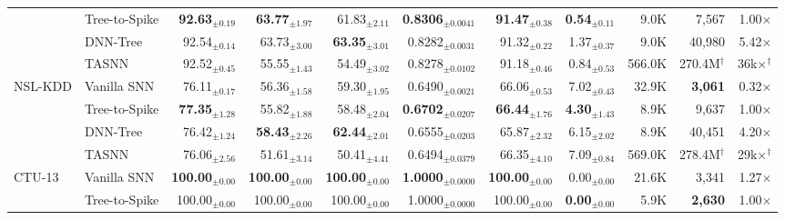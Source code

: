 \begin{table}[!ht]
{\begin{tabular}{l l r r r r r r r r r}
& Tree-to-Spike & \cellcolor{bestcell}\textbf{92.63$_{\pm0.19}$} & \cellcolor{bestcell}\textbf{63.77$_{\pm1.97}$} & 61.83$_{\pm2.11}$ & \cellcolor{bestcell}\textbf{0.8306$_{\pm0.0041}$} & \cellcolor{bestcell}\textbf{91.47$_{\pm0.38}$} & \cellcolor{bestcell}\textbf{0.54$_{\pm0.11}$} & 9.0K & 7,567 & 1.00$\times$ \\
& DNN-Tree      & 92.54$_{\pm0.14}$ & 63.73$_{\pm3.00}$ & \cellcolor{bestcell}\textbf{63.35$_{\pm3.01}$} & 0.8282$_{\pm0.0031}$ & 91.32$_{\pm0.22}$ & 1.37$_{\pm0.37}$ & 9.0K & 40,980 & 5.42$\times$ \\
& TASNN         & 92.52$_{\pm0.45}$ & 55.55$_{\pm1.43}$ & 54.49$_{\pm3.02}$ & 0.8278$_{\pm0.0102}$ & 91.18$_{\pm0.46}$ & 0.84$_{\pm0.53}$ & 566.0K & 270.4M$^\dagger$ & 36k$\times$$^\dagger$ \\
\midrule
\multirow{4}{*}{NSL-KDD}
& Vanilla SNN   & 76.11$_{\pm0.17}$ & 56.36$_{\pm1.58}$ & 59.30$_{\pm1.95}$ & 0.6490$_{\pm0.0021}$ & 66.06$_{\pm0.53}$ & 7.02$_{\pm0.43}$ & 32.9K & \cellcolor{bestcell}\textbf{3,061} & 0.32$\times$ \\
& Tree-to-Spike & \cellcolor{bestcell}\textbf{77.35$_{\pm1.28}$} & 55.82$_{\pm1.88}$ & 58.48$_{\pm2.04}$ & \cellcolor{bestcell}\textbf{0.6702$_{\pm0.0207}$} & \cellcolor{bestcell}\textbf{66.44$_{\pm1.76}$} & \cellcolor{bestcell}\textbf{4.30$_{\pm1.43}$} & 8.9K & 9,637 & 1.00$\times$ \\
& DNN-Tree      & 76.42$_{\pm1.24}$ & \cellcolor{bestcell}\textbf{58.43$_{\pm2.26}$} & \cellcolor{bestcell}\textbf{62.44$_{\pm2.01}$} & 0.6555$_{\pm0.0203}$ & 65.87$_{\pm2.32}$ & 6.15$_{\pm2.02}$ & 8.9K & 40,451 & 4.20$\times$ \\
& TASNN         & 76.06$_{\pm2.56}$ & 51.61$_{\pm3.14}$ & 50.41$_{\pm4.41}$ & 0.6494$_{\pm0.0379}$ & 66.35$_{\pm4.10}$ & 7.09$_{\pm0.84}$ & 569.0K & 278.4M$^\dagger$ & 29k$\times$$^\dagger$ \\
\midrule
\multirow{4}{*}{CTU-13}
& Vanilla SNN   & \cellcolor{bestcell}\textbf{100.00$_{\pm0.00}$} & \cellcolor{bestcell}\textbf{100.00$_{\pm0.00}$} & \cellcolor{bestcell}\textbf{100.00$_{\pm0.00}$} & \cellcolor{bestcell}\textbf{1.0000$_{\pm0.0000}$} & \cellcolor{bestcell}\textbf{100.00$_{\pm0.00}$} & 0.00$_{\pm0.00}$ & 21.6K & 3,341 & 1.27$\times$ \\
& Tree-to-Spike & 100.00$_{\pm0.00}$ & 100.00$_{\pm0.00}$ & 100.00$_{\pm0.00}$ & 1.0000$_{\pm0.0000}$ & 100.00$_{\pm0.00}$ & \cellcolor{bestcell}\textbf{0.00$_{\pm0.00}$} & 5.9K & \cellcolor{bestcell}\textbf{2,630} & 1.00$\times$ \\

\end{tabular}}
\end{table}
